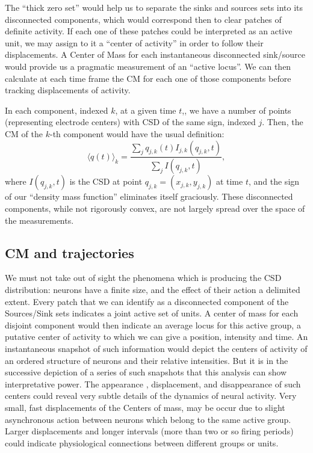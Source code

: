 \documentclass[12pt, letterpaper]{article}
\begin{document}
The ``thick zero set'' would help us to separate the sinks and sources sets into
its disconnected components, which would correspond then to clear patches of
definite activity. If each one of these patches could be
interpreted as an active unit,
we may assign to it a ``center of activity'' in order to follow their displacements.
A Center of Mass for each instantaneous disconnected sink/source would provide us
a pragmatic measurement of an ``active locus''. We can then calculate at each time
frame the CM for each one of those components before tracking displacements of activity.


In each component, indexed $k$, at a given time $t$,, we have a number of points
(representing electrode centers)
with CSD of the same sign, indexed $j$. Then, the CM of the $k$-th
component would have the usual definition:
\begin{equation}\label{cmparadisj}
   \langle q(t) \rangle_k =\frac{\sum_j q_{j,k} (t) I_{j,k} (q_{j,k},t)}
           {\sum_j I(q_{j,k},t)},
\end{equation}
where $I(q_{j,k},t)$ is the CSD at point $q_{j,k}=(x_{j,k}, y_{j,k})$ at time $t$,
and the
sign of our ``density mass function'' eliminates itself graciously.
These disconnected components, while not rigorously convex,
are not largely spread over the space of the measurements.



\subsection{CM and trajectories}

We must not take out of sight the phenomena which is producing the CSD distribution:
neurons have a finite size, and the effect of their action a delimited extent.
Every patch that we can identify as a disconnected component of the Sources/Sink
sets indicates a  joint active set of units. A center of mass for each disjoint
component would then indicate an average locus for this active group, a putative center of activity to which we can give a position, intensity and time. An instantaneous snapshot of such information would depict the centers of activity of an ordered structure of neurons and their relative intensities. But it is in the successive depiction of a series of such snapshots that this analysis can show interpretative power. The appearance , displacement, and disappearance of such centers could reveal very subtle details of the dynamics of neural activity. Very small, fast displacements of the Centers of mass, may be occur due to slight asynchronous action between neurons which belong to the same active group.
Larger displacements and  longer intervals (more than two or so firing periods)
could indicate physiological connections between different groups or units.
\end{document}
